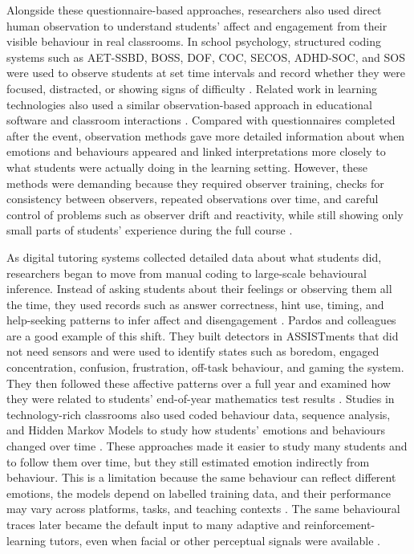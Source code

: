 Alongside these questionnaire-based approaches, researchers also used direct human observation to understand students' affect and engagement from their visible behaviour in real classrooms. In school psychology, structured coding systems such as \ac{AET-SSBD}, \ac{BOSS}, \ac{DOF}, \ac{COC}, \ac{SECOS}, \ac{ADHD-SOC}, and \ac{SOS} were used to observe students at set time intervals and record whether they were focused, distracted, or showing signs of difficulty \cite{Volpe2005ObservingStudents,Shapiro2004AcademicSkillsProblemsWorkbook}. Related work in learning technologies also used a similar observation-based approach in educational software and classroom interactions \cite{Baker2010BetterFrustratedThanBored,Liu2017DetectStudentsAcademicEmotions}. Compared with questionnaires completed after the event, observation methods gave more detailed information about when emotions and behaviours appeared and linked interpretations more closely to what students were actually doing in the learning setting. However, these methods were demanding because they required observer training, checks for consistency between observers, repeated observations over time, and careful control of problems such as observer drift and reactivity, while still showing only small parts of students' experience during the full course \cite{Volpe2005ObservingStudents}.

As digital tutoring systems collected detailed data about what students did, researchers began to move from manual coding to large-scale behavioural inference. Instead of asking students about their feelings or observing them all the time, they used records such as answer correctness, hint use, timing, and help-seeking patterns to infer affect and disengagement \cite{Baker2007OffTaskBehaviorITS,Cocea2009OffTaskGamingLearning}. Pardos and colleagues are a good example of this shift. They built detectors in \ac{ASSISTments} that did not need sensors and were used to identify states such as boredom, engaged concentration, confusion, frustration, off-task behaviour, and gaming the system. They then followed these affective patterns over a full year and examined how they were related to students' end-of-year mathematics test results \cite{Pardos2014AffectiveStatesStateTests}. Studies in technology-rich classrooms also used coded behaviour data, sequence analysis, and Hidden Markov Models to study how students' emotions and behaviours changed over time \cite{Liu2017DetectStudentsAcademicEmotions}. These approaches made it easier to study many students and to follow them over time, but they still estimated emotion indirectly from behaviour. This is a limitation because the same behaviour can reflect different emotions, the models depend on labelled training data, and their performance may vary across platforms, tasks, and teaching contexts \cite{Pardos2014AffectiveStatesStateTests}. The same behavioural traces later became the default input to many adaptive and reinforcement-learning tutors, even when facial or other perceptual signals were available \cite{zerkouk_comprehensive_2025,meng_self-evolving_2025}.

